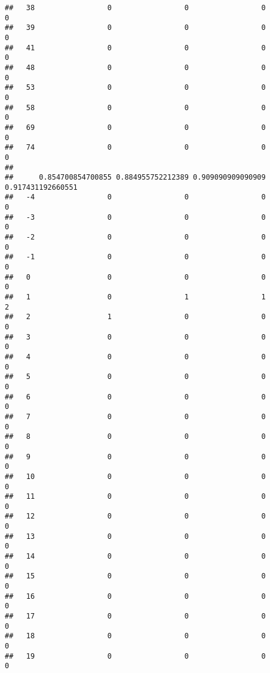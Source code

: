 \documentclass[]{article}
\begin{document}
\begin{verbatim}
##   38                 0                 0                 0                 0
##   39                 0                 0                 0                 0
##   41                 0                 0                 0                 0
##   48                 0                 0                 0                 0
##   53                 0                 0                 0                 0
##   58                 0                 0                 0                 0
##   69                 0                 0                 0                 0
##   74                 0                 0                 0                 0
##     
##      0.854700854700855 0.884955752212389 0.909090909090909 0.917431192660551
##   -4                 0                 0                 0                 0
##   -3                 0                 0                 0                 0
##   -2                 0                 0                 0                 0
##   -1                 0                 0                 0                 0
##   0                  0                 0                 0                 0
##   1                  0                 1                 1                 2
##   2                  1                 0                 0                 0
##   3                  0                 0                 0                 0
##   4                  0                 0                 0                 0
##   5                  0                 0                 0                 0
##   6                  0                 0                 0                 0
##   7                  0                 0                 0                 0
##   8                  0                 0                 0                 0
##   9                  0                 0                 0                 0
##   10                 0                 0                 0                 0
##   11                 0                 0                 0                 0
##   12                 0                 0                 0                 0
##   13                 0                 0                 0                 0
##   14                 0                 0                 0                 0
##   15                 0                 0                 0                 0
##   16                 0                 0                 0                 0
##   17                 0                 0                 0                 0
##   18                 0                 0                 0                 0
##   19                 0                 0                 0                 0

\end{verbatim}
\end{document}
